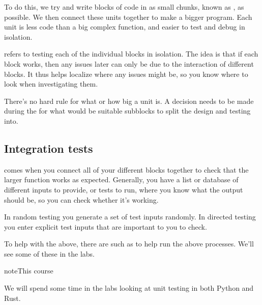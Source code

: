 \documentclass[letterpaper,10pt,british]{sphinxmanual}
\begin{document}
\sphinxAtStartPar
To do this, we try and write blocks of code in as small chunks, known as , as possible. We then connect these units together to make a bigger program. Each unit is less code than a big complex function, and easier to test and debug in isolation.

\sphinxAtStartPar
{} refers to testing each of the individual blocks in isolation. The idea is that if each block works, then any issues later can only be due to the interaction of different blocks. It thus helps localize where any issues might be, so you know where to look when investigating them.

\sphinxAtStartPar
There’s no hard rule for what or how big a unit is. A decision needs to be made during the {\hyperref[\detokenize{chapters/software_lifecycle/software_architecture:software-architecture}]{}} for what would be suitable sub\sphinxhyphen{}blocks to split the design and testing into.


\subsection{Integration tests}
\label{\detokenize{chapters/software_development_tools/automated_testing:integration-tests}}\label{\detokenize{chapters/software_development_tools/automated_testing:integration-testing}}
\sphinxAtStartPar
{} comes when you connect all of your different blocks together to check that the larger function works as expected. Generally, you have a list or database of different inputs to provide, or tests to run, where you know what the output should be, so you can check whether it’s working.

\sphinxAtStartPar
In random testing you generate a set of test inputs randomly. In directed testing you enter explicit test inputs that are important to you to check.

\sphinxAtStartPar
To help with the above, there are  such as  to help run the above processes. We’ll see some of these in the labs.

\begin{sphinxadmonition}{note}{This course}

\sphinxAtStartPar
We will spend some time in the labs looking at unit testing in both Python and Rust.
\end{sphinxadmonition}
\end{document}
